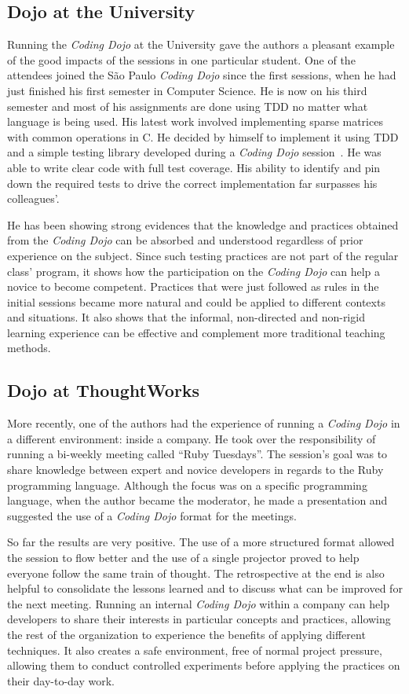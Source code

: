 \subsection{Dojo at the University}

Running the \emph{Coding Dojo} at the University gave the authors a pleasant example of
the good impacts of the sessions in one particular student. One of the attendees joined the São
Paulo \emph{Coding Dojo} since the first sessions,
when he had just finished his first semester in Computer Science. He is now on his third semester
and most of his assignments are done using TDD no matter what language is being used. His latest
work involved implementing sparse matrices with common operations in C. He decided by himself to
implement it using TDD and a simple testing library developed during a \emph{Coding Dojo}
session~\cite{Dojo31}. He was able to write clear code with full test coverage. His ability to
identify and pin down the required tests to drive the correct implementation far surpasses his
colleagues'.

He has been showing strong evidences that the knowledge and practices obtained from the
\emph{Coding Dojo} can be absorbed and understood regardless of prior experience on the
subject. Since such testing practices are not part of the regular class' program, it shows
how the participation on the \emph{Coding Dojo} can help a novice to become competent. Practices
that were just followed as rules in the initial sessions became more natural and could be applied
to different contexts and situations. It also shows that the informal, non-directed and non-rigid
learning experience can be effective and complement more traditional teaching methods.

\subsection{Dojo at ThoughtWorks}

More recently, one of the authors had the experience of running a \emph{Coding Dojo}
in a different environment: inside a company. He took over the responsibility of running a
bi-weekly meeting called ``Ruby Tuesdays''. The session's goal was to share knowledge between
expert and novice developers in regards to the Ruby programming language. Although the focus was on
a specific programming language, when the author became the moderator, he made a presentation
and suggested the use of a \emph{Coding Dojo} format for the meetings.

So far the results are very positive. The use of a more structured format allowed the session to
flow better and the use of a single projector proved to help everyone follow the same train of
thought. The retrospective at the end is also helpful to consolidate the lessons learned and to
discuss what can be improved for the next meeting. Running an internal \emph{Coding Dojo} within
a company can help developers to share their interests in particular concepts and practices, allowing
the rest of the organization to experience the benefits of applying different techniques. It also
creates a safe environment, free of normal project pressure, allowing them to conduct controlled
experiments before applying the practices on their day-to-day work.